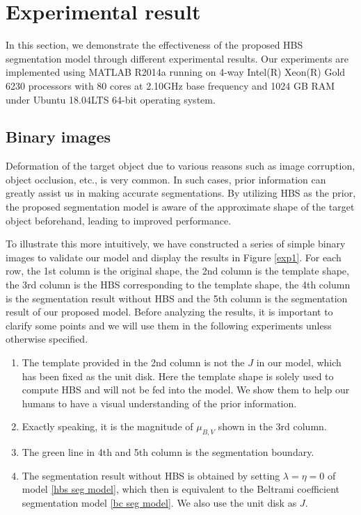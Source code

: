 \documentclass[review,onefignum,onetabnum]{siamonline190516}
\begin{document}
\section{Experimental result}\label{resul}
In this section, we demonstrate the effectiveness of the proposed HBS segmentation model through different experimental results. Our experiments are implemented using MATLAB R2014a running on 4-way Intel(R) Xeon(R) Gold 6230 processors with 80 cores at 2.10GHz base frequency and 1024 GB RAM under Ubuntu 18.04LTS 64-bit operating system.

\subsection{Binary images}
Deformation of the target object due to various reasons such as image corruption, object occlusion, etc., is very common. In such cases, prior information can greatly assist us in making accurate segmentations. By utilizing HBS as the prior, the proposed segmentation model is aware of the approximate shape of the target object beforehand, leading to improved performance. 

To illustrate this more intuitively, we have constructed a series of simple binary images to validate our model and display the results in Figure \ref{exp1}. For each row, the 1st column is the original shape, the 2nd column is the template shape, the 3rd column is the HBS corresponding to the template shape, the 4th column is the segmentation result without HBS and the 5th column is the segmentation result of our proposed model. Before analyzing the results, it is important to clarify some points and we will use them in the following experiments unless otherwise specified.
\begin{enumerate}
    \item The template provided in the 2nd column is not the $J$ in our model, which has been fixed as the unit disk. Here the template shape is solely used to compute HBS and will not be fed into the model. We show them to help our humans to have a visual understanding of the prior information.
    \item Exactly speaking, it is the magnitude of $\mu_{B,V}$ shown in the 3rd column.
    \item The green line in 4th and 5th column is the segmentation boundary.
    \item The segmentation result without HBS is obtained by setting $\lambda = \eta = 0$ of model \ref{hbs seg model}, which then is equivalent to the Beltrami coefficient segmentation model \ref{bc seg model}. We also use the unit disk as $J$.
\end{enumerate}
\end{document}
